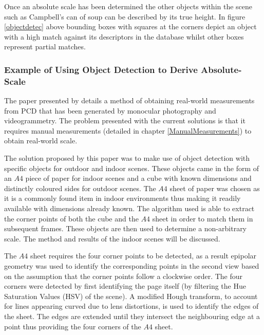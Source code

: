 Once an absolute scale has been determined the other objects within the scene such as Campbell's can of soup can be described by its true height. In figure \ref{objectdetec} above bounding boxes with squares at the corners depict an object with a high match against its descriptors in the database whilst other boxes represent partial matches.

\subsubsection*{Example of Using Object Detection to Derive Absolute-Scale}

The paper presented by \citet{rashidi_generating_2014} details a method of obtaining real-world measurements from PCD that has been generated by monocular photography and videogrammetry. The problem presented with the current solutions is that it requires manual measurements (detailed in chapter \ref{ManualMeasurements}) to obtain real-world scale. 

The solution proposed by this paper was to make use of object detection with specific objects for outdoor and indoor scenes. These objects came in the form of an $A4$ piece of paper for indoor scenes and a cube with known dimensions and distinctly coloured sides for outdoor scenes. The $A4$ sheet of paper was chosen as it is a commonly found item in indoor environments thus making it readily available with dimensions already known. The algorithm used is able to extract the corner points of both the cube and the $A4$ sheet in order to match them in subsequent frames. These objects are then used to determine a non-arbitrary scale. The method and results of the indoor scenes will be discussed. 

The $A4$ sheet requires the four corner points to be detected, as a result epipolar geometry was used to identify the corresponding points in the second view based on the assumption that the corner points follow a clockwise order. The four corners were detected by first identifying the page itself (by filtering the Hue Saturation Values (HSV) of the scene). A modified Hough transform, to account for lines appearing curved due to lens distortions, is used to identify the edges of the sheet. The edges are extended until they intersect the neighbouring edge at a point thus providing the four corners of the $A4$ sheet.

